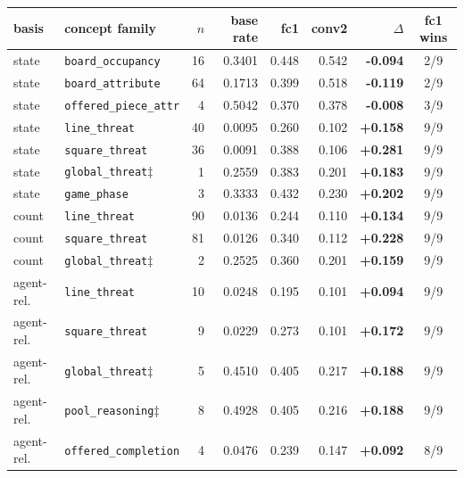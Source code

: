 \begin{tabular}{llrrrrrc}
\toprule
basis & concept family & $n$ & base rate & fc1 & conv2 & $\Delta$ & fc1 wins \\
\midrule
state & \texttt{board\_occupancy} & 16 & 0.3401 & 0.448 & 0.542 & \textbf{-0.094} & 2/9 \\
state & \texttt{board\_attribute} & 64 & 0.1713 & 0.399 & 0.518 & \textbf{-0.119} & 2/9 \\
state & \texttt{offered\_piece\_attr} & 4 & 0.5042 & 0.370 & 0.378 & \textbf{-0.008} & 3/9 \\
\midrule
state & \texttt{line\_threat} & 40 & 0.0095 & 0.260 & 0.102 & \textbf{+0.158} & 9/9 \\
state & \texttt{square\_threat} & 36 & 0.0091 & 0.388 & 0.106 & \textbf{+0.281} & 9/9 \\
state & \texttt{global\_threat}$\ddagger$ & 1 & 0.2559 & 0.383 & 0.201 & \textbf{+0.183} & 9/9 \\
state & \texttt{game\_phase} & 3 & 0.3333 & 0.432 & 0.230 & \textbf{+0.202} & 9/9 \\
count & \texttt{line\_threat} & 90 & 0.0136 & 0.244 & 0.110 & \textbf{+0.134} & 9/9 \\
count & \texttt{square\_threat} & 81 & 0.0126 & 0.340 & 0.112 & \textbf{+0.228} & 9/9 \\
count & \texttt{global\_threat}$\ddagger$ & 2 & 0.2525 & 0.360 & 0.201 & \textbf{+0.159} & 9/9 \\
agent-rel. & \texttt{line\_threat} & 10 & 0.0248 & 0.195 & 0.101 & \textbf{+0.094} & 9/9 \\
agent-rel. & \texttt{square\_threat} & 9 & 0.0229 & 0.273 & 0.101 & \textbf{+0.172} & 9/9 \\
agent-rel. & \texttt{global\_threat}$\ddagger$ & 5 & 0.4510 & 0.405 & 0.217 & \textbf{+0.188} & 9/9 \\
agent-rel. & \texttt{pool\_reasoning}$\ddagger$ & 8 & 0.4928 & 0.405 & 0.216 & \textbf{+0.188} & 9/9 \\
agent-rel. & \texttt{offered\_completion} & 4 & 0.0476 & 0.239 & 0.147 & \textbf{+0.092} & 8/9 \\
\bottomrule
\end{tabular}
